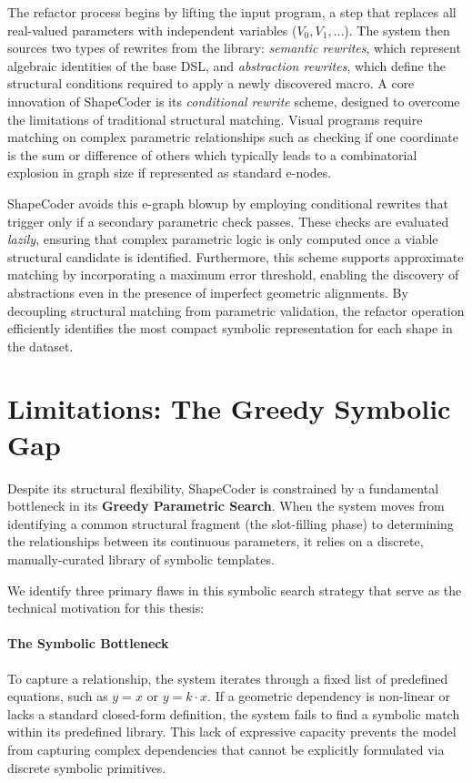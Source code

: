 \documentclass{thesis}
\begin{document}
The refactor process begins by lifting the input program, a step that replaces all real-valued parameters with independent variables ($V_0, V_1, \dots$). The system then sources two types of rewrites from the library: \textit{semantic rewrites}, which represent algebraic identities of the base DSL, and \textit{abstraction rewrites}, which define the structural conditions required to apply a newly discovered macro. A core innovation of ShapeCoder is its \textit{conditional rewrite} scheme, designed to overcome the limitations of traditional structural matching. Visual programs require matching on complex parametric relationships such as checking if one coordinate is the sum or difference of others which typically leads to a combinatorial explosion in graph size if represented as standard e-nodes. 

ShapeCoder avoids this e-graph blowup by employing conditional rewrites that trigger only if a secondary parametric check passes. These checks are evaluated \textit{lazily}, ensuring that complex parametric logic is only computed once a viable structural candidate is identified. Furthermore, this scheme supports approximate matching by incorporating a maximum error threshold, enabling the discovery of abstractions even in the presence of imperfect geometric alignments. By decoupling structural matching from parametric validation, the refactor operation efficiently identifies the most compact symbolic representation for each shape in the dataset.


\section{Limitations: The Greedy Symbolic Gap}

Despite its structural flexibility, ShapeCoder is constrained by a fundamental bottleneck in its \textbf{Greedy Parametric Search}. When the system moves from identifying a common structural fragment (the slot-filling phase) to determining the relationships between its continuous parameters, it relies on a discrete, manually-curated library of symbolic templates.

We identify three primary flaws in this symbolic search strategy that serve as the technical motivation for this thesis:

\paragraph{The Symbolic Bottleneck} To capture a relationship, the system iterates through a fixed list of predefined equations, such as $y = x$ or $y = k \cdot x$. If a geometric dependency is non-linear or lacks a standard closed-form definition, the system fails to find a symbolic match within its predefined library. This lack of expressive capacity prevents the model from capturing complex dependencies that cannot be explicitly formulated via discrete symbolic primitives.
\end{document}
